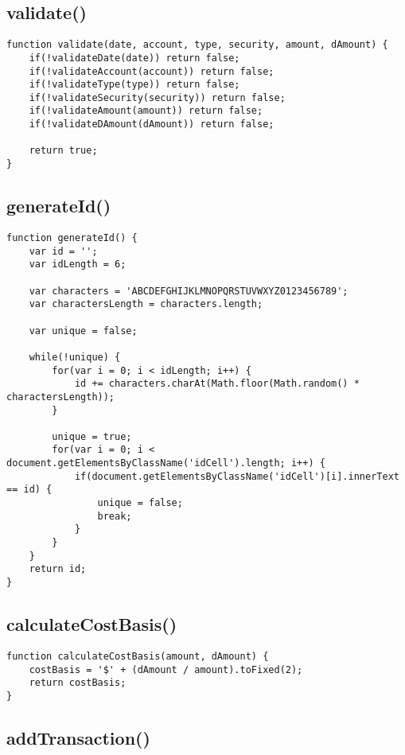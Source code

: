 \documentclass[letterpaper]{article}
\begin{document}
\subsection{validate()}

\begin{lstlisting}[firstnumber=25]
function validate(date, account, type, security, amount, dAmount) {
    if(!validateDate(date)) return false;
    if(!validateAccount(account)) return false;
    if(!validateType(type)) return false;
    if(!validateSecurity(security)) return false;
    if(!validateAmount(amount)) return false;
    if(!validateDAmount(dAmount)) return false;

    return true;
}
\end{lstlisting}

\subsection{generateId()}

\begin{lstlisting}[firstnumber=108]
function generateId() {
    var id = '';
    var idLength = 6;

    var characters = 'ABCDEFGHIJKLMNOPQRSTUVWXYZ0123456789';
    var charactersLength = characters.length;

    var unique = false;

    while(!unique) {
        for(var i = 0; i < idLength; i++) {
            id += characters.charAt(Math.floor(Math.random() * charactersLength));
        }

        unique = true;
        for(var i = 0; i < document.getElementsByClassName('idCell').length; i++) {
            if(document.getElementsByClassName('idCell')[i].innerText == id) {
                unique = false;
                break;
            }
        }
    }
    return id;
}
\end{lstlisting}

\subsection{calculateCostBasis()}

\begin{lstlisting}[firstnumber=133]
function calculateCostBasis(amount, dAmount) {
    costBasis = '$' + (dAmount / amount).toFixed(2);
    return costBasis;
}
\end{lstlisting}

\subsection{addTransaction()}
\end{document}
